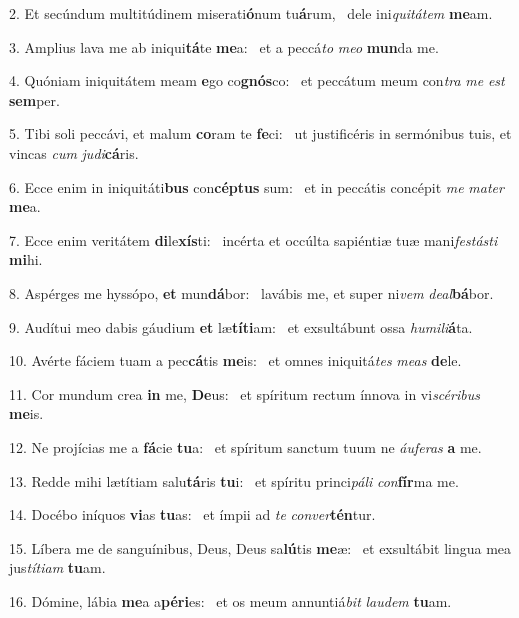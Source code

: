 2. Et secúndum multitúdinem miserati\textbf{ó}num tu\textbf{á}rum, \ast\  dele ini\textit{qui}\textit{tá}\textit{tem} \textbf{me}am.\

3. Amplius lava me ab iniqui\textbf{tá}te \textbf{me}a: \ast\  et a peccá\textit{to} \textit{me}\textit{o} \textbf{mun}da me.\

4. Quóniam iniquitátem meam \textbf{e}go co\textbf{gnós}co: \ast\  et peccátum meum con\textit{tra} \textit{me} \textit{est} \textbf{sem}per.\

5. Tibi soli peccávi, et malum \textbf{co}ram te \textbf{fe}ci: \ast\  ut justificéris in sermónibus tuis, et vincas \textit{cum} \textit{ju}\textit{di}\textbf{cá}ris.\

6. Ecce enim in iniquitáti\textbf{bus} con\textbf{cép}\textbf{tus} sum: \ast\  et in peccátis concépit \textit{me} \textit{ma}\textit{ter} \textbf{me}a.\

7. Ecce enim veritátem \textbf{di}le\textbf{xís}ti: \ast\  incérta et occúlta sapiéntiæ tuæ mani\textit{fes}\textit{tás}\textit{ti} \textbf{mi}hi.\

8. Aspérges me hyssópo, \textbf{et} mun\textbf{dá}bor: \ast\  lavábis me, et super ni\textit{vem} \textit{de}\textit{al}\textbf{bá}bor.\

9. Audítui meo dabis gáudium \textbf{et} læ\textbf{tí}\textbf{ti}am: \ast\  et exsultábunt ossa \textit{hu}\textit{mi}\textit{li}\textbf{á}ta.\

10. Avérte fáciem tuam a pec\textbf{cá}tis \textbf{me}is: \ast\  et omnes iniquitá\textit{tes} \textit{me}\textit{as} \textbf{de}le.\

11. Cor mundum crea \textbf{in} me, \textbf{De}us: \ast\  et spíritum rectum ínnova in vi\textit{scé}\textit{ri}\textit{bus} \textbf{me}is.\

12. Ne projícias me a \textbf{fá}cie \textbf{tu}a: \ast\  et spíritum sanctum tuum ne \textit{áu}\textit{fe}\textit{ras} \textbf{a} me.\

13. Redde mihi lætítiam salu\textbf{tá}ris \textbf{tu}i: \ast\  et spíritu princi\textit{pá}\textit{li} \textit{con}\textbf{fír}ma me.\

14. Docébo iníquos \textbf{vi}as \textbf{tu}as: \ast\  et ímpii ad \textit{te} \textit{con}\textit{ver}\textbf{tén}tur.\

15. Líbera me de sanguínibus, Deus, Deus sa\textbf{lú}tis \textbf{me}æ: \ast\  et exsultábit lingua mea jus\textit{tí}\textit{ti}\textit{am} \textbf{tu}am.\

16. Dómine, lábia \textbf{me}a a\textbf{pé}\textbf{ri}es: \ast\  et os meum annuntiá\textit{bit} \textit{lau}\textit{dem} \textbf{tu}am.\

